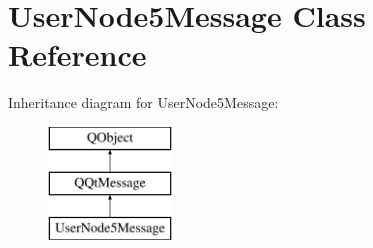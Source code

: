 \hypertarget{class_user_node5_message}{}\section{User\+Node5\+Message Class Reference}
\label{class_user_node5_message}
Inheritance diagram for User\+Node5\+Message\+:\begin{figure}[H]
\begin{center}
\leavevmode
\includegraphics[height=3.000000cm]{class_user_node5_message}
\end{center}
\end{figure}
